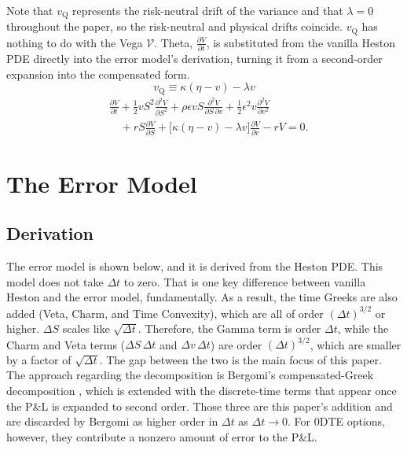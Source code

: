 \documentclass[11pt]{article}
\begin{document}
Note that $v_{\mathrm{Q}}$ represents the risk-neutral drift of the variance and that $\lambda = 0$ throughout the paper, so the risk-neutral and physical drifts coincide.
$v_{\mathrm{Q}}$ has nothing to do with the Vega $\mathcal{V}$.
Theta, $\frac{\partial V}{\partial t}$, is substituted from the vanilla Heston PDE directly into the error model's derivation, turning it from a second-order expansion into the compensated form.
\[ v_{\mathrm{Q}} \equiv \kappa(\eta - v) - \lambda v \]
\[
\begin{aligned}
&\frac{\partial V}{\partial t}
+ \frac{1}{2} v S^2 \frac{\partial^2 V}{\partial S^2}
+ \rho \epsilon v S \frac{\partial^2 V}{\partial S\,\partial v}
+ \frac{1}{2} \epsilon^2 v \frac{\partial^2 V}{\partial v^2} \\
&\quad {} + rS \frac{\partial V}{\partial S}
+ \big[\kappa(\eta - v) - \lambda v\big] \frac{\partial V}{\partial v}
- rV = 0.
\end{aligned}
\]

\section{The Error Model}
\label{sec:errormodel}
\subsection{Derivation}

The error model is shown below, and it is derived from the Heston PDE. This model does not take $\Delta t$ to zero. That is one key difference between vanilla Heston and the error model, fundamentally.
As a result, the time Greeks are also added (Veta, Charm, and Time Convexity), which are all of order $(\Delta t)^{3/2}$ or higher. $\Delta S$ scales like $\sqrt{\Delta t}$. Therefore, the Gamma term is order $\Delta t$, while the Charm and Veta terms ($\Delta S\,\Delta t$ and $\Delta v\,\Delta t$) are order $(\Delta t)^{3/2}$, which are smaller by a factor of $\sqrt{\Delta t}$. The gap between the two
is the main focus of this paper. The approach regarding the decomposition is Bergomi's compensated-Greek decomposition \cite{bergomi2016}, which is extended with
the discrete-time terms that appear once the P\&L is expanded to second order. Those three are this paper's addition and are discarded by Bergomi as higher order in $\Delta t$
as $\Delta t \to 0$. For 0DTE options, however, they contribute a nonzero amount of error to the P\&L.
\end{document}
